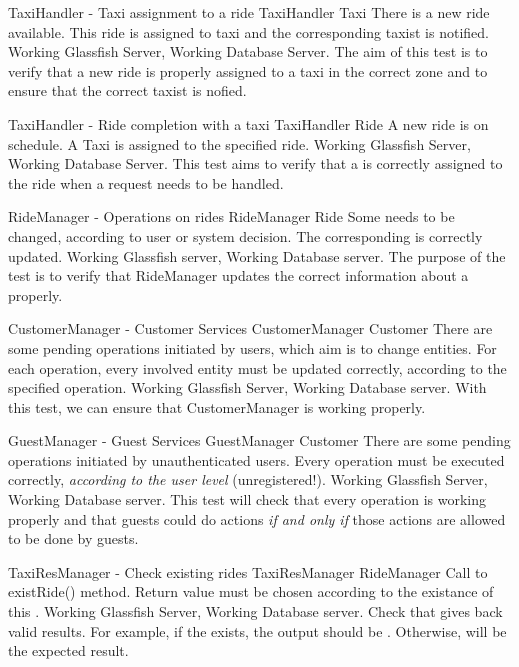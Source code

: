 \testx
{TaxiHandler - Taxi assignment to a ride}
{TaxiHandler}
{Taxi}
{There is a new ride available.}
{This ride is assigned to taxi and the corresponding taxist is notified.}
{Working Glassfish Server, Working Database Server.}
{The aim of this test is to verify that a new ride is properly assigned to
a taxi in the correct zone and to ensure that the correct taxist is nofied.}

\testx
{TaxiHandler - Ride completion with a taxi}
{TaxiHandler}
{Ride}
{A new ride is on schedule.}
{A Taxi is assigned to the specified ride.}
{Working Glassfish Server, Working Database Server.}
{This test aims to verify that a  is correctly assigned to the ride
when a request needs to be handled.}

\testx
{RideManager - Operations on rides}
{RideManager}
{Ride}
{Some  needs to be changed, according to user or system decision.}
{The corresponding  is correctly updated.}
{Working Glassfish server, Working Database server.}
{The purpose of the test is to verify that RideManager updates the correct
information about a  properly.}

\testx
{CustomerManager - Customer Services}
{CustomerManager}
{Customer}
{There are some pending operations initiated by users, which aim is to change
 entities.}
{For each operation, every involved  entity must be updated correctly,
according to the specified operation.}
{Working Glassfish Server, Working Database server.}
{With this test, we can ensure that CustomerManager is working properly.}

\testx
{GuestManager - Guest Services}
{GuestManager}
{Customer}
{There are some pending operations initiated by unauthenticated users.}
{Every operation must be executed correctly, \emph{according to the user level}
(unregistered!).}
{Working Glassfish Server, Working Database server.}
{This test will check that every  operation is working properly
and that guests could do actions \emph{if and only if} those actions are allowed
to be done by guests.}

\testx
{TaxiResManager - Check existing rides}
{TaxiResManager}
{RideManager}
{Call to existRide() method.}
{Return value must be chosen according to the existance of this .}
{Working Glassfish Server, Working Database server.}
{Check that  gives back valid results. For example, if
the  exists, the output should be . Otherwise,
 will be the expected result.}

